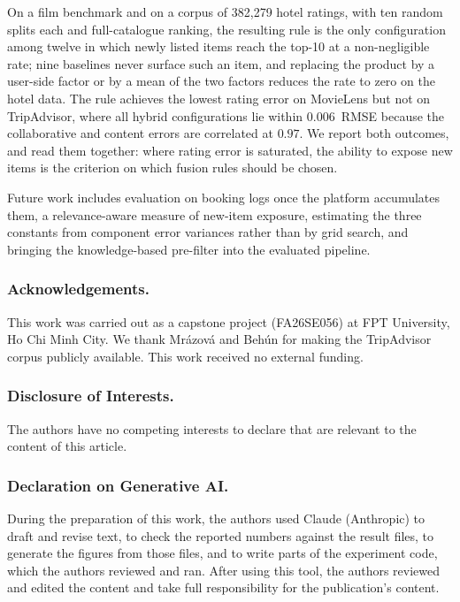 \documentclass[runningheads]{llncs}
\begin{document}
On a film benchmark and on a corpus of 382{,}279 hotel ratings, with ten random splits each and full-catalogue ranking, the resulting rule is the only configuration among twelve in which newly listed items reach the top-10 at a non-negligible rate; nine baselines never surface such an item, and replacing the product by a user-side factor or by a mean of the two factors reduces the rate to zero on the hotel data. The rule achieves the lowest rating error on MovieLens but not on TripAdvisor, where all hybrid configurations lie within $0.006$~RMSE because the collaborative and content errors are correlated at $0.97$. We report both outcomes, and read them together: where rating error is saturated, the ability to expose new items is the criterion on which fusion rules should be chosen.

Future work includes evaluation on booking logs once the platform accumulates them, a relevance-aware measure of new-item exposure, estimating the three constants from component error variances rather than by grid search, and bringing the knowledge-based pre-filter into the evaluated pipeline.

\subsubsection*{Acknowledgements.} This work was carried out as a capstone project (FA26SE056) at FPT University, Ho Chi Minh City. We thank Mr\'azov\'a and Beh\'un for making the TripAdvisor corpus publicly available. This work received no external funding.

\subsubsection*{Disclosure of Interests.} The authors have no competing interests to declare that are relevant to the content of this article.

\subsubsection*{Declaration on Generative AI.} During the preparation of this work, the authors used Claude (Anthropic) to draft and revise text, to check the reported numbers against the result files, to generate the figures from those files, and to write parts of the experiment code, which the authors reviewed and ran. After using this tool, the authors reviewed and edited the content and take full responsibility for the publication's content.
\end{document}
